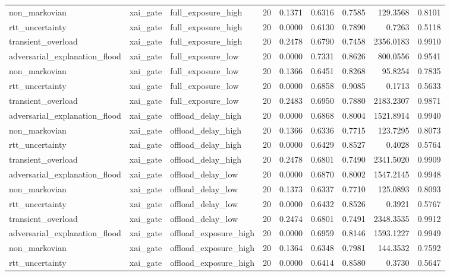 \begin{table}[t]
\begin{tabular}{lllrrrrrr}
non\_markovian & xai\_gate & full\_exposure\_high & 20 & 0.1371 & 0.6316 & 0.7585 & 129.3568 & 0.8101 \\
rtt\_uncertainty & xai\_gate & full\_exposure\_high & 20 & 0.0000 & 0.6130 & 0.7890 & 0.7263 & 0.5118 \\
transient\_overload & xai\_gate & full\_exposure\_high & 20 & 0.2478 & 0.6790 & 0.7458 & 2356.0183 & 0.9910 \\
adversarial\_explanation\_flood & xai\_gate & full\_exposure\_low & 20 & 0.0000 & 0.7331 & 0.8626 & 800.0556 & 0.9541 \\
non\_markovian & xai\_gate & full\_exposure\_low & 20 & 0.1366 & 0.6451 & 0.8268 & 95.8254 & 0.7835 \\
rtt\_uncertainty & xai\_gate & full\_exposure\_low & 20 & 0.0000 & 0.6858 & 0.9085 & 0.1713 & 0.5633 \\
transient\_overload & xai\_gate & full\_exposure\_low & 20 & 0.2483 & 0.6950 & 0.7880 & 2183.2307 & 0.9871 \\
adversarial\_explanation\_flood & xai\_gate & offload\_delay\_high & 20 & 0.0000 & 0.6868 & 0.8004 & 1521.8914 & 0.9940 \\
non\_markovian & xai\_gate & offload\_delay\_high & 20 & 0.1366 & 0.6336 & 0.7715 & 123.7295 & 0.8073 \\
rtt\_uncertainty & xai\_gate & offload\_delay\_high & 20 & 0.0000 & 0.6429 & 0.8527 & 0.4028 & 0.5764 \\
transient\_overload & xai\_gate & offload\_delay\_high & 20 & 0.2478 & 0.6801 & 0.7490 & 2341.5020 & 0.9909 \\
adversarial\_explanation\_flood & xai\_gate & offload\_delay\_low & 20 & 0.0000 & 0.6870 & 0.8002 & 1547.2145 & 0.9948 \\
non\_markovian & xai\_gate & offload\_delay\_low & 20 & 0.1373 & 0.6337 & 0.7710 & 125.0893 & 0.8093 \\
rtt\_uncertainty & xai\_gate & offload\_delay\_low & 20 & 0.0000 & 0.6432 & 0.8526 & 0.3921 & 0.5767 \\
transient\_overload & xai\_gate & offload\_delay\_low & 20 & 0.2474 & 0.6801 & 0.7491 & 2348.3535 & 0.9912 \\
adversarial\_explanation\_flood & xai\_gate & offload\_exposure\_high & 20 & 0.0000 & 0.6959 & 0.8146 & 1593.1227 & 0.9949 \\
non\_markovian & xai\_gate & offload\_exposure\_high & 20 & 0.1364 & 0.6348 & 0.7981 & 144.3532 & 0.7592 \\
rtt\_uncertainty & xai\_gate & offload\_exposure\_high & 20 & 0.0000 & 0.6414 & 0.8580 & 0.3730 & 0.5647 \\

\end{tabular}
\end{table}
